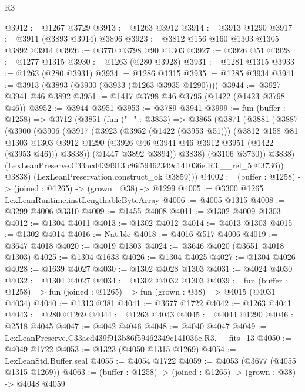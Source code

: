\begin{lexlean}{R3}
\begin{coremodule}
@3912 := @1267 @3729
@3913 := @1263 @3912
@3914 := @3913 @1290
@3917 := @3911 (@3893 @3914) @3896
@3923 := @3812 @156 @160 @1303 @1305 @3892 @3914
@3926 := @3770 @3798 @90 @1303
@3927 := @3926 @51
@3928 := @1277 @1315
@3930 := @1263 (@280 @3928)
@3931 := @1281 @1315
@3933 := @1263 (@280 @3931)
@3934 := @1286 @1315
@3935 := @1285 @3934
@3941 := @3913 (@3893 (@3930 (@3933 (@1263 @3935 @1290))))
@3944 := @3927 @3941 @46 @3892
@3951 := @1417 @3798 @46 @3795 (@1422 (@1423 @3798 @46))
@3952 := @3944 @3951
@3953 := @3789 @3941
@3999 := fun (buffer : @1258) =>
  @3712
    (@3851
      (fun ("_" : @3853) =>
      @3865
        (@3871
          (@3881
            (@3887
              (@3900
                (@3906
                  (@3917
                    (@3923
                      (@3952 (@1422 (@3953 @51)))
                      (@3812
                        @158
                        @81
                        @1303
                        @1303
                        @3912
                        @1290
                        (@3926 @46 @3941 @46 @3912 @3951 (@1422 (@3953 @46)))
                        @3838))
                    (@1447 @3892 @3894))
                  @3838)
                (@3106 @3730))
              @3838)
            (LexLeanPreserve.C33acd439f913b86f59462349c141036e.R3.__rel_5 @3736))
          @3838)
        (LexLeanPreservation.construct_ok @3859)))
@4002 := (buffer : @1258) -> (joined : @1265) -> (grown : @38) -> @1299
@4005 := @3300 @1265 LexLeanRuntime.instLengthableByteArray
@4006 := @4005 @1315
@4008 := @3299 @4006 @3310
@4009 := @1455 @4008
@4011 := @1302 @4009 @1303
@4012 := @1304 @4011
@4013 := @1302 @4012
@4014 := @4013 @1303
@4015 := @1302 @4014
@4016 := Nat.ble
@4018 := @4016 @517 @4006
@4019 := @3647 @4018
@4020 := @4019 @1303
@4024 := @3646 @4020 (@3651 @4018 @1303)
@4025 := @1304 @1633
@4026 := @1304 @4025
@4027 := @1304 @4026
@4028 := @1639 @4027
@4030 := @1302 @4028 @1303
@4031 := @4024 @4030
@4032 := @1304 @4027
@4034 := @1302 @4032 @1303
@4039 := fun (buffer : @1258) => fun (joined : @1265) => fun (grown : @38) => @4015 (@4031 @4034)
@4040 := @1313 @381
@4041 := @3677 @1722
@4042 := @1263 @4041
@4043 := @280 @1269
@4044 := @1263 @4043
@4045 := @4044 @1290
@4046 := @2518 @4045
@4047 := @4042 @4046
@4048 := @4040 @4047
@4049 := LexLeanPreserve.C33acd439f913b86f59462349c141036e.R3.__fits_13
@4050 := @4049 @1722
@4053 := @1323 (@4050 @1315 @1269)
@4054 := LexLeanStd.Buffer.seal
@4055 := @4054 @1722
@4059 := @4053 (@3677 (@4055 @1315 @1269))
@4063 := (buffer : @1258) -> (joined : @1265) -> (grown : @38) -> @4048 @4059

\end{coremodule}
\end{lexlean}
